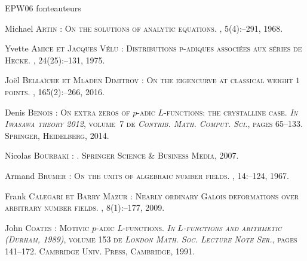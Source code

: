 \documentclass[12pt]{amsart}
\theoremstyle{defstyle}
\theoremstyle{thmstyle}
\begin{document}
	

\begin{thebibliography}{EPW06}
\expandafter\ifx\csname fonteauteurs\endcsname\relax
\def\fonteauteurs{\scshape}\fi

Michael \bgroup\fonteauteurs\bgroup Artin\egroup\egroup{} :
\newblock On the solutions of analytic equations.
, 5(4)\string:--291, 1968.

Yvette \bgroup\fonteauteurs\bgroup Amice\egroup\egroup{} et Jacques
  \bgroup\fonteauteurs\bgroup V{\'e}lu\egroup\egroup{} :
\newblock Distributions p-adiques associ{\'e}es aux s{\'e}ries de {H}ecke.
, 24(25)\string:--131, 1975.

Jo{\"e}l \bgroup\fonteauteurs\bgroup Bella{\"\i}che\egroup\egroup{} et Mladen
  \bgroup\fonteauteurs\bgroup Dimitrov\egroup\egroup{} :
\newblock On the eigencurve at classical weight $1$ points.
, 165(2)\string:--266, 2016.

Denis \bgroup\fonteauteurs\bgroup Benois\egroup\egroup{} :
\newblock On extra zeros of {$p$}-adic {$L$}-functions: the crystalline case.
\newblock \emph{In} {\em Iwasawa theory 2012}, volume~7 de {\em Contrib. Math.
  Comput. Sci.}, pages 65--133. Springer, Heidelberg, 2014.

Nicolas \bgroup\fonteauteurs\bgroup Bourbaki\egroup\egroup{} :
.
\newblock Springer Science \& Business Media, 2007.

Armand \bgroup\fonteauteurs\bgroup Brumer\egroup\egroup{} :
\newblock On the units of algebraic number fields.
, 14\string:--124, 1967.

Frank \bgroup\fonteauteurs\bgroup Calegari\egroup\egroup{} et Barry
  \bgroup\fonteauteurs\bgroup Mazur\egroup\egroup{} :
\newblock Nearly ordinary {G}alois deformations over arbitrary number fields.
, 8(1)\string:--177,
  2009.

John \bgroup\fonteauteurs\bgroup Coates\egroup\egroup{} :
\newblock Motivic {$p$}-adic {$L$}-functions.
\newblock \emph{In} {\em {$L$}-functions and arithmetic ({D}urham, 1989)},
  volume 153 de {\em London Math. Soc. Lecture Note Ser.}, pages 141--172.
  Cambridge Univ. Press, Cambridge, 1991.


\end{thebibliography}
\end{document}
